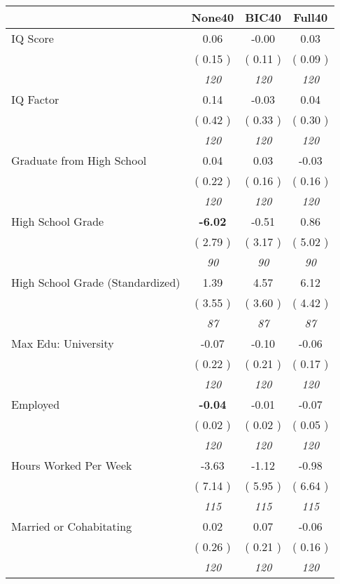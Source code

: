 \begin{tabular}{l c c c}
\toprule
 & None40 & BIC40 & Full40 \\
\midrule
IQ Score &      0.06 &     -0.00 &      0.03 \\
& (     0.15 ) & (     0.11 ) & (     0.09 ) \\
& \textit{ 120 } & \textit{ 120 } & \textit{ 120 } \\
IQ Factor &      0.14 &     -0.03 &      0.04 \\
& (     0.42 ) & (     0.33 ) & (     0.30 ) \\
& \textit{ 120 } & \textit{ 120 } & \textit{ 120 } \\
Graduate from High School &      0.04 &      0.03 &     -0.03 \\
& (     0.22 ) & (     0.16 ) & (     0.16 ) \\
& \textit{ 120 } & \textit{ 120 } & \textit{ 120 } \\
High School Grade & \textbf{     -6.02 } &     -0.51 &      0.86 \\
& (     2.79 ) & (     3.17 ) & (     5.02 ) \\
& \textit{ 90 } & \textit{ 90 } & \textit{ 90 } \\
High School Grade (Standardized) &      1.39 &      4.57 &      6.12 \\
& (     3.55 ) & (     3.60 ) & (     4.42 ) \\
& \textit{ 87 } & \textit{ 87 } & \textit{ 87 } \\
Max Edu: University &     -0.07 &     -0.10 &     -0.06 \\
& (     0.22 ) & (     0.21 ) & (     0.17 ) \\
& \textit{ 120 } & \textit{ 120 } & \textit{ 120 } \\
Employed & \textbf{     -0.04 } &     -0.01 &     -0.07 \\
& (     0.02 ) & (     0.02 ) & (     0.05 ) \\
& \textit{ 120 } & \textit{ 120 } & \textit{ 120 } \\
Hours Worked Per Week &     -3.63 &     -1.12 &     -0.98 \\
& (     7.14 ) & (     5.95 ) & (     6.64 ) \\
& \textit{ 115 } & \textit{ 115 } & \textit{ 115 } \\
Married or Cohabitating &      0.02 &      0.07 &     -0.06 \\
& (     0.26 ) & (     0.21 ) & (     0.16 ) \\
& \textit{ 120 } & \textit{ 120 } & \textit{ 120 } \\

\end{tabular}
